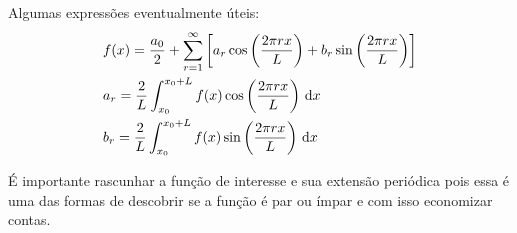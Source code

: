 \documentclass[a4paper,12pt, leqno, answers]{exam}
\begin{document}
\thispagestyle{empty}

\newpage
\setcounter{page}{1}

Algumas expressões eventualmente \'{u}teis:
\begin{align}
  & f(x) = \frac{a_0}{2} + \sum_{r = 1}^\infty \left[ a_r \cos\left( \frac{2 \pi r x}{L} \right) + b_r \sin\left( \frac{2 \pi r x}{L} \right) \right] \label{eq:serie_fourier} \\
  & a_r = \frac{2}{L} \int_{x_0}^{x_0 + L} f(x) \cos\left( \frac{2 \pi r x}{L} \right) \, \mathrm{d}x \label{eq:serie_fourier_a} \\
  & b_r = \frac{2}{L} \int_{x_0}^{x_0 + L} f(x) \sin\left( \frac{2 \pi r x}{L} \right) \, \mathrm{d}x \label{eq:serie_fourier_b}
\end{align}

É importante rascunhar a função de interesse e sua extensão periódica pois essa
é uma das formas de descobrir se a função é par ou ímpar e com isso economizar
contas.
\end{document}
